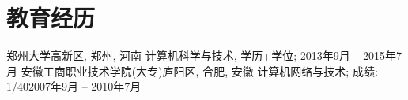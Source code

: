 \section{\textbf{教育经历}}
  \resumeSubHeadingListStart
    \resumeSubheading
      {郑州大学}{高新区, 郑州, 河南}
      {计算机科学与技术, 学历+学位; }{2013年9月 -- 2015年7月}
    \resumeSubheading
      {安徽工商职业技术学院(大专)}{庐阳区, 合肥, 安徽}
      {计算机网络与技术; 成绩: 1/40}{2007年9月 -- 2010年7月}
  \resumeSubHeadingListEnd